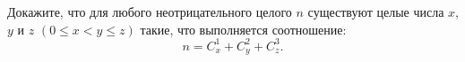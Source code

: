 \documentclass{article}
\begin{document}
Докажите, что для любого неотрицательного целого $n$ существуют целые числа $x$, $y$ и $z$ $(0 \leqslant x < y \leqslant z)$ такие, что 
выполняется соотношение: $$n = C_x^1 + C_y^2 + C_z^3.$$
\end{document}
